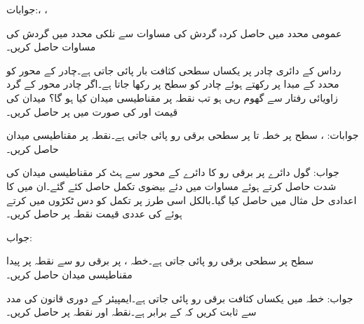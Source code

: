 جوابات:، ، 

عمومی محدد میں حاصل کردہ گردش کی مساوات سے نلکی محدد میں گردش کی مساوات حاصل کریں۔

رداس  کے دائری چادر پر یکساں سطحی کثافت بار  پائی جاتی ہے۔چادر کے محور کو محدد کے مبدا پر رکھتے ہوئے چادر کو سطح  پر رکھا جاتا ہے۔اگر چادر محور کے گرد زاویائی رفتار  سے گھوم رہی ہو تب نقطہ  پر مقناطیسی میدان  کیا ہو گا؟ میدان کی قیمت  اور  کی صورت میں  پر حاصل کریں۔

جوابات: ، 
سطح  پر خطہ  تا  پر سطحی برقی رو  پائی جاتی ہے۔نقطہ  پر مقناطیسی میدان حاصل کریں۔

جواب:
گول دائرے پر برقی رو کا دائرے کے محور سے ہٹ کر مقناطیسی میدان کی شدت حاصل کرتے ہوئے مساوات  میں دئے بیضوی تکمل حاصل کئے گئے۔ان میں  کا اعدادی حل مثال  میں حاصل کیا گیا۔بالکل اسی طرز پر تکمل کو دس ٹکڑوں میں کرتے ہوئے   کی عددی قیمت نقطہ  پر حاصل کریں۔

جواب:

سطح  پر سطحی برقی رو  پائی جاتی ہے۔خطہ ،  پر برقی رو سے نقطہ  پر پیدا مقناطیسی میدان  حاصل کریں۔

جواب: 
خطہ  میں یکساں کثافت برقی رو  پائی جاتی ہے۔ایمپیئر  کے دوری قانون کی مدد سے ثابت کریں کہ  کے برابر ہے۔نقطہ  اور نقطہ  پر  حاصل کریں۔

